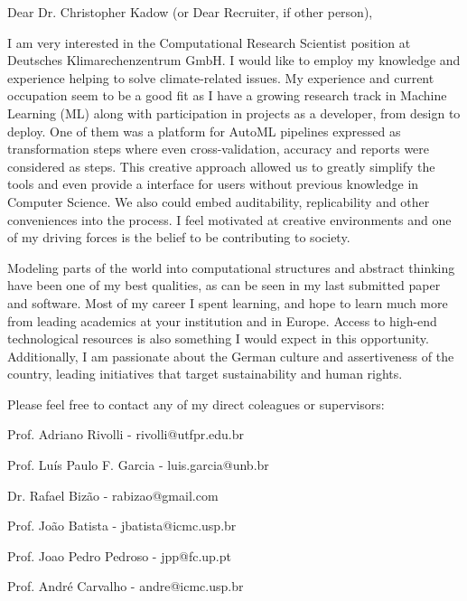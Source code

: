 \documentclass[letterpaper,11pt]{article}
\begin{document}
\vspace{40pt}

{\justifying
\Large
{}
Dear Dr. Christopher Kadow (or Dear Recruiter, if other person),
\vspace{10pt}

I am very interested in the Computational Research Scientist position  at Deutsches Klimarechenzentrum GmbH.
I would like to employ my knowledge and experience helping to solve climate-related issues.
My experience and current occupation seem to be a good fit as I have  a growing research track in Machine Learning (ML) along with participation in projects as a developer, from design to deploy.
One of them was a platform for AutoML pipelines expressed as transformation steps where even cross-validation, accuracy and reports were considered as steps.
This creative approach allowed us to greatly simplify the tools and even provide a interface for users without previous knowledge in Computer Science. We also could embed auditability, replicability and other conveniences into the process.
I feel motivated at creative environments and one of my driving forces is the belief to be contributing to society.

}

{\justifying
\Large
{}
Modeling parts of the world into computational structures and abstract thinking have been one of my best qualities, as can be seen in my last submitted paper and software.
Most of my career I spent learning, and hope to learn much more from leading academics at your institution and in Europe.
Access to high-end technological resources is also something I would expect in this opportunity.
Additionally, I am passionate about the German culture and assertiveness of the country, leading initiatives that target sustainability and human rights.
\vspace{20pt}

Please feel free to contact any of my direct coleagues or supervisors:

Prof. Adriano Rivolli - rivolli@utfpr.edu.br

Prof. Luís Paulo F. Garcia - luis.garcia@unb.br

Dr. Rafael Bizão - rabizao@gmail.com

Prof. João Batista - jbatista@icmc.usp.br

Prof. Joao Pedro Pedroso - jpp@fc.up.pt

Prof. André Carvalho - andre@icmc.usp.br

}
\end{document}
